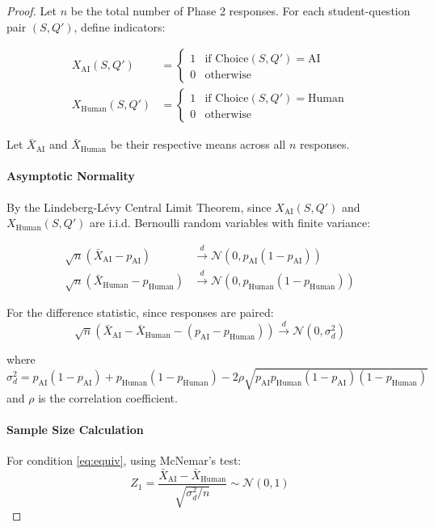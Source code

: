 \begin{proof}
Let $n$ be the total number of Phase 2 responses. For each student-question pair $(S,Q')$, define indicators:

\begin{align}
X_{\mathrm{AI}}(S,Q') &= \begin{cases}
1 & \text{if } \mathrm{Choice}(S,Q') = \mathrm{AI} \\
0 & \text{otherwise}
\end{cases} \label{eq:x_ai} \\[1em]
X_{\mathrm{Human}}(S,Q') &= \begin{cases}
1 & \text{if } \mathrm{Choice}(S,Q') = \mathrm{Human} \\
0 & \text{otherwise}
\end{cases} \label{eq:x_human}
\end{align}

Let $\bar{X}_{\mathrm{AI}}$ and $\bar{X}_{\mathrm{Human}}$ be their respective means across all $n$ responses.

\paragraph{Asymptotic Normality}
By the Lindeberg-Lévy Central Limit Theorem, since $X_{\mathrm{AI}}(S,Q')$ and $X_{\mathrm{Human}}(S,Q')$ are i.i.d. Bernoulli random variables with finite variance:

\begin{align}
\sqrt{n}(\bar{X}_{\mathrm{AI}} - p_{\mathrm{AI}}) &\xrightarrow{d} \mathcal{N}(0, p_{\mathrm{AI}}(1-p_{\mathrm{AI}})) \\
\sqrt{n}(\bar{X}_{\mathrm{Human}} - p_{\mathrm{Human}}) &\xrightarrow{d} \mathcal{N}(0, p_{\mathrm{Human}}(1-p_{\mathrm{Human}}))
\end{align}

For the difference statistic, since responses are paired:
\begin{equation}
\sqrt{n}(\bar{X}_{\mathrm{AI}} - \bar{X}_{\mathrm{Human}} - (p_{\mathrm{AI}} - p_{\mathrm{Human}})) \xrightarrow{d} \mathcal{N}(0, \sigma^2_d)
\end{equation}

where $\sigma^2_d = p_{\mathrm{AI}}(1-p_{\mathrm{AI}}) + p_{\mathrm{Human}}(1-p_{\mathrm{Human}}) - 2\rho\sqrt{p_{\mathrm{AI}}p_{\mathrm{Human}}(1-p_{\mathrm{AI}})(1-p_{\mathrm{Human}})}$ and $\rho$ is the correlation coefficient.

\paragraph{Sample Size Calculation}
For condition \eqref{eq:equiv}, using McNemar's test:
\begin{equation}
Z_1 = \frac{\bar{X}_{\mathrm{AI}} - \bar{X}_{\mathrm{Human}}}{\sqrt{\sigma^2_d/n}} \sim \mathcal{N}(0,1)
\end{equation}


\end{proof}
